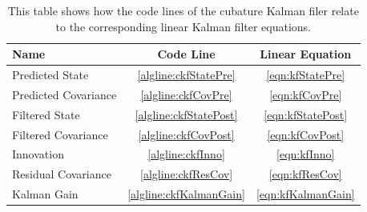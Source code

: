 		\begin{table}
			\centering
			\begin{tabular}{l|c|c}
				\textbf{Name}        &     \textbf{Code Line}      & \textbf{Linear Equation} \\ \hline
				Predicted State      &  \ref{algline:ckfStatePre}  &  \eqref{eqn:kfStatePre}  \\
				Predicted Covariance &   \ref{algline:ckfCovPre}   &   \eqref{eqn:kfCovPre}   \\
				Filtered State       & \ref{algline:ckfStatePost}  & \eqref{eqn:kfStatePost}  \\
				Filtered Covariance  &  \ref{algline:ckfCovPost}   &  \eqref{eqn:kfCovPost}   \\
				Innovation           &    \ref{algline:ckfInno}    &    \eqref{eqn:kfInno}    \\
				Residual Covariance  &   \ref{algline:ckfResCov}   &   \eqref{eqn:kfResCov}   \\
				Kalman Gain          & \ref{algline:ckfKalmanGain} & \eqref{eqn:kfKalmanGain}
			\end{tabular}
			\caption{This table shows how the code lines of the cubature Kalman filer relate to the corresponding linear Kalman filter equations.}
			\label{tab:cubatureKalmanFilter}
		\end{table}

